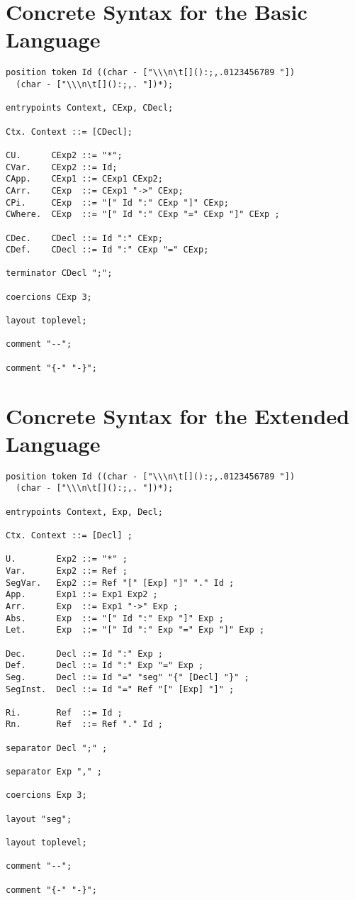 \section{Concrete Syntax for the Basic Language} \label{apdix:concrete-syntax-basic}
\begin{Verbatim}[fontsize=\small]
position token Id ((char - ["\\\n\t[]():;,.0123456789 "])
  (char - ["\\\n\t[]():;,. "])*);

entrypoints Context, CExp, CDecl;

Ctx. Context ::= [CDecl];

CU.      CExp2 ::= "*";
CVar.    CExp2 ::= Id;
CApp.    CExp1 ::= CExp1 CExp2;
CArr.    CExp  ::= CExp1 "->" CExp;
CPi.     CExp  ::= "[" Id ":" CExp "]" CExp;
CWhere.  CExp  ::= "[" Id ":" CExp "=" CExp "]" CExp ;

CDec.    CDecl ::= Id ":" CExp;
CDef.    CDecl ::= Id ":" CExp "=" CExp;

terminator CDecl ";";

coercions CExp 3;

layout toplevel;

comment "--";

comment "{-" "-}";
\end{Verbatim}

\section{Concrete Syntax for the Extended Language} \label{apdix:concrete-syntax-extend}
\begin{Verbatim}[fontsize=\small]
position token Id ((char - ["\\\n\t[]():;,.0123456789 "]) 
  (char - ["\\\n\t[]():;,. "])*);

entrypoints Context, Exp, Decl;

Ctx. Context ::= [Decl] ;

U.        Exp2 ::= "*" ;
Var.      Exp2 ::= Ref ;
SegVar.   Exp2 ::= Ref "[" [Exp] "]" "." Id ;
App.      Exp1 ::= Exp1 Exp2 ;
Arr.      Exp  ::= Exp1 "->" Exp ;
Abs.      Exp  ::= "[" Id ":" Exp "]" Exp ;
Let.      Exp  ::= "[" Id ":" Exp "=" Exp "]" Exp ;

Dec.      Decl ::= Id ":" Exp ;
Def.      Decl ::= Id ":" Exp "=" Exp ;
Seg.      Decl ::= Id "=" "seg" "{" [Decl] "}" ;
SegInst.  Decl ::= Id "=" Ref "[" [Exp] "]" ; 

Ri.       Ref  ::= Id ;
Rn.       Ref  ::= Ref "." Id ;

separator Decl ";" ;

separator Exp "," ;

coercions Exp 3;

layout "seg";

layout toplevel;

comment "--";

comment "{-" "-}";
\end{Verbatim}


